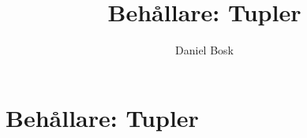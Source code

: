 \documentclass[a4paper,10pt,oneside,openright,
               oldfontcommands]{memoir}
\begin{document}
\title{%
  Behållare: Tupler
}
\author{Daniel Bosk}

\maketitle

\begin{abstract}
  
\end{abstract}

\clearpage

\tableofcontents*

\chapter{Behållare: Tupler}



\appendix


\printbibliography
\end{document}
